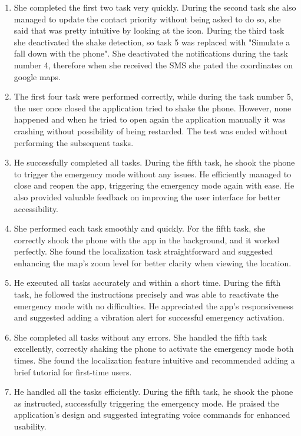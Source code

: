 \documentclass[12pt]{article}
\begin{document}
\begin{enumerate}
    \item She completed the first two task very quickly. During the second task she 
    also managed to update the contact priority without being asked to do so, 
    she said that was pretty intuitive by looking at the icon. During the third task 
    she deactivated the shake detection, so task 5 was replaced with "Simulate a 
    fall down with the phone". She deactivated the 
    notifications during the task number 4, therefore when she received the SMS 
    she pated the coordinates on google maps.

    \item The first four task were performed correctly, while during the 
    task number 5, the user once closed the application tried to shake the phone.
    However, none happened and when he tried to open again the application 
    manually it was crashing without possibility of being restarded. The 
    test was ended without performing the subsequent tasks.

    \item He successfully completed all tasks. During the fifth task, he shook the phone to trigger the emergency mode without any issues. He efficiently managed to close and reopen the app, triggering the emergency mode again with ease. He also provided valuable feedback on improving the user interface for better accessibility.

    \item She performed each task smoothly and quickly. For the fifth task, she correctly shook the phone with the app in the background, and it worked perfectly. She found the localization task straightforward and suggested enhancing the map's zoom level for better clarity when viewing the location.

    \item He executed all tasks accurately and within a short time. During the fifth task, he followed the instructions precisely and was able to reactivate the emergency mode with no difficulties. He appreciated the app's responsiveness and suggested adding a vibration alert for successful emergency activation.

    \item She completed all tasks without any errors. She handled the fifth task excellently, correctly shaking the phone to activate the emergency mode both times. She found the localization feature intuitive and recommended adding a brief tutorial for first-time users.

    \item He handled all the tasks efficiently. During the fifth task, he shook the phone as instructed, successfully triggering the emergency mode. He praised the application's design and suggested integrating voice commands for enhanced usability.


\end{enumerate}
\end{document}
